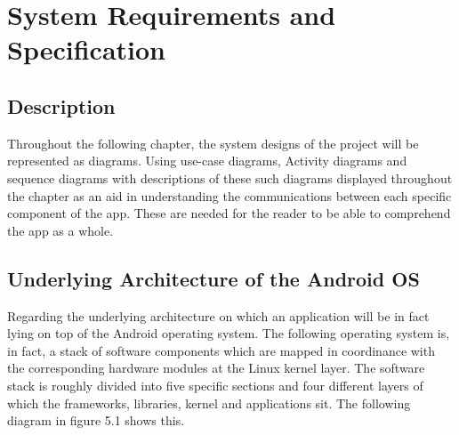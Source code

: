 \chapter{System Requirements and Specification}

\section{Description}
Throughout the following chapter, the system designs of the project will be represented as diagrams. Using use-case diagrams, Activity diagrams and sequence diagrams with descriptions of these such diagrams displayed throughout the chapter as an aid in understanding the communications between each specific component of the app. These are needed for the reader to be able to comprehend the app as a whole. 

\section{Underlying Architecture of the Android OS}
Regarding the underlying architecture on which an application will be in fact lying on top of the Android operating system. The following operating system is, in fact, a stack of software components which are mapped in coordinance with the corresponding hardware modules at the Linux kernel layer. The software stack is roughly divided into five specific sections and four different layers of which the frameworks, libraries, kernel and applications sit. The following diagram in figure 5.1 shows this. 

